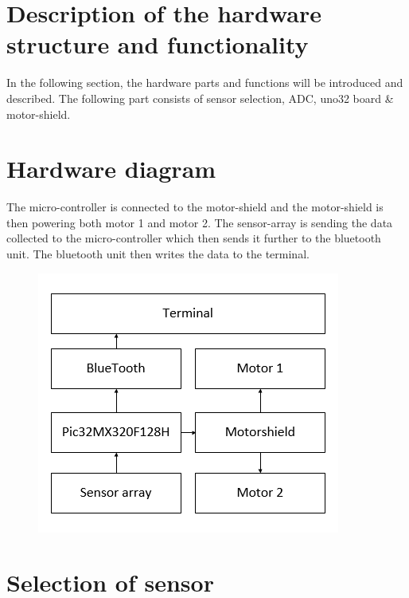 \section{Description of the hardware structure and functionality}
In the following section, the hardware parts and functions will be introduced and described. The following part consists of sensor selection, ADC, uno32 board \& motor-shield.

\section{Hardware diagram}
The micro-controller is connected to the motor-shield and the motor-shield is then powering both motor 1 and motor 2. The sensor-array is sending the data collected to the micro-controller which then sends it further to the bluetooth unit. The bluetooth unit then writes the data to the terminal. 

 \begin{figure}[!ht]
    	\centering    		\includegraphics[width=.6\textwidth]{figures/hardwaredia2.png}
    	\caption{}
    	\label{Hardware diagram}
    \end{figure}

\section{Selection of sensor}

